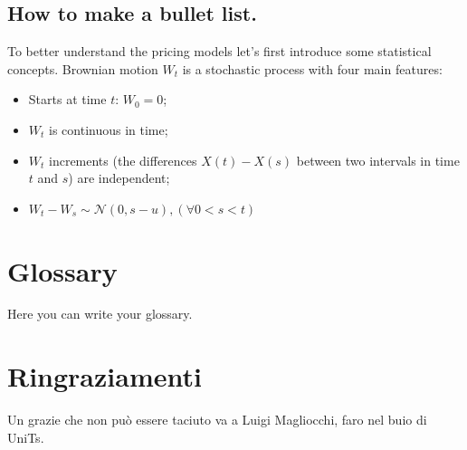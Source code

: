 \documentclass[12pt]{book}
\begin{document}
\section{How to make a bullet list.}
To better understand the pricing models let's first introduce some statistical concepts. Brownian motion $W_t$ is a stochastic process with four main features: 
\begin{itemize}
    \item Starts at time $t$: $W_0 = 0$;
    \item $W_t$ is continuous in time;
    \item $W_t$ increments (the differences $X(t)-X(s)$ between two intervals in time $t$ and $s$) are independent;
    \item $W_t - W_s \sim \mathcal{N}(0, s-u), (\forall 0 < s < t) $
\end{itemize}



\appendix 
\chapter{Glossary}
Here you can write your glossary.


\chapter{Ringraziamenti}

Un grazie che non può essere taciuto va a Luigi Magliocchi, faro nel buio di UniTs.
\end{document}
